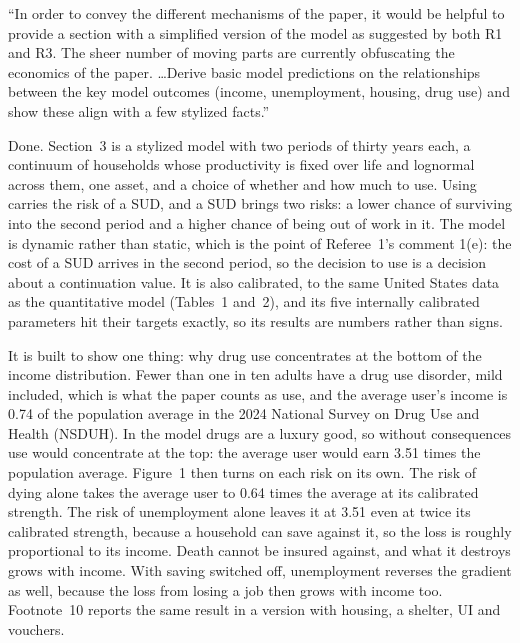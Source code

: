 \documentclass[11pt]{article}
\begin{document}
\begin{referee}
``In order to convey the different mechanisms of the paper, it would be helpful
to provide a section with a simplified version of the model as suggested by both
R1 and R3. The sheer number of moving parts are currently obfuscating the
economics of the paper. \dots Derive basic model predictions on the relationships
between the key model outcomes (income, unemployment, housing, drug use) and show
these align with a few stylized facts.''
\end{referee}
\begin{response}
Done. Section~3 is a stylized model with two periods of thirty years each, a
continuum of households whose productivity is fixed over life and lognormal
across them, one asset, and a choice of whether and how much to use. Using carries
the risk of a SUD, and a SUD brings two risks: a lower chance of surviving into the
second period and a higher chance of being out of work in it. The model is dynamic
rather than static, which is the point of Referee~1's comment 1(e): the cost of a
SUD arrives in the second period, so the decision to use is a decision about a
continuation value. It is also calibrated, to the same United States data as the
quantitative model (Tables~1 and~2), and its five internally calibrated parameters
hit their targets exactly, so its results are numbers rather than signs.

It is built to show one thing: why drug use concentrates at the bottom of the
income distribution. Fewer than one in ten adults have a drug use disorder, mild
included, which is what the paper counts as use, and the average user's income is
0.74 of the population average in the 2024 National Survey on Drug Use and Health
(NSDUH). In the model drugs are a luxury good, so without consequences use would
concentrate at the top: the average user would earn 3.51 times the population
average. Figure~1 then turns on each risk on its own. The risk of dying alone takes
the average user to 0.64 times the average at its calibrated strength. The risk of
unemployment alone leaves it at 3.51 even at twice its calibrated strength, because
a household can save against it, so the loss is roughly proportional to its
income. Death cannot be insured against, and what it destroys grows with income.
With saving switched off, unemployment reverses the gradient as well, because the
loss from losing a job then grows with income too. Footnote~10 reports the same
result in a version with housing, a shelter, UI and vouchers.


\end{response}
\end{document}
